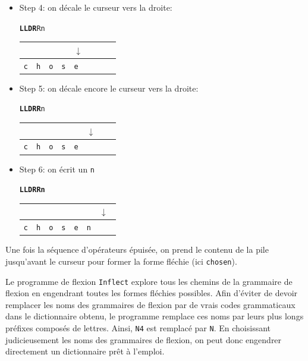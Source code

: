 \begin{itemize}
\bigskip
\item Step 4: on décale le curseur vers la droite:

\begin{center}
\texttt{\textbf{LLDR}Rn}

\begin{tabular}{|l|l|l|l|l|l|l|l}
\multicolumn{4}{l}{} & \multicolumn{4}{l}{$\downarrow$} \\
\hline
\verb+c+ & \verb+h+ & \verb+o+ & \verb+s+ & \verb+e+ & \verb+ + & \verb+ + & \\
\hline
\end{tabular}
\end{center}

\bigskip
\item Step 5: on décale encore le curseur vers la droite:

\begin{center}
\texttt{\textbf{LLDRR}n}

\begin{tabular}{|l|l|l|l|l|l|l|l}
\multicolumn{5}{l}{} & \multicolumn{3}{l}{$\downarrow$} \\
\hline
\verb+c+ & \verb+h+ & \verb+o+ & \verb+s+ & \verb+e+ & \verb+ + & \verb+ + & \\
\hline
\end{tabular}
\end{center}

\bigskip
\item Step 6: on écrit un \verb+n+

\begin{center}
\texttt{\textbf{LLDRRn}}

\begin{tabular}{|l|l|l|l|l|l|l|l}
\multicolumn{6}{l}{} & \multicolumn{2}{l}{$\downarrow$} \\
\hline
\verb+c+ & \verb+h+ & \verb+o+ & \verb+s+ & \verb+e+ & \verb+n+ & \verb+ + & \\
\hline
\end{tabular}
\end{center}
\end{itemize}

\bigskip
\noindent Une fois la séquence d’opérateurs épuisée, on prend le contenu de la pile jusqu’avant le
curseur pour former la forme fléchie (ici \verb+chosen+).

\bigskip
\noindent Le programme de flexion \verb+Inflect+ explore tous les chemins de la grammaire de flexion
en engendrant toutes les formes fléchies possibles. Afin d’éviter de devoir remplacer les noms des
grammaires de flexion par de vrais codes grammaticaux dans le dictionnaire obtenu, le programme
remplace ces noms par leurs plus longs préfixes composés de lettres. Ainsi, \verb+N4+ est remplacé
par \verb+N+. En choisissant judicieusement les noms des grammaires de flexion, on peut donc
engendrer directement un dictionnaire prêt à l’emploi.

